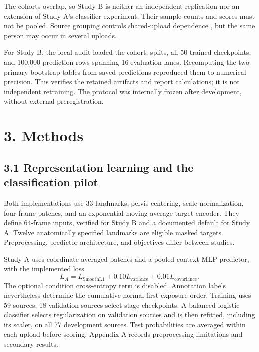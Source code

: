\documentclass{article}
\begin{document}
The cohorts overlap, so Study B is neither an independent replication
nor an extension of Study A's classifier experiment. Their sample counts
and scores must not be pooled. Source grouping controls shared-upload
dependence \citep{roberts2017crossvalidation}, but the same person may
occur in several uploads.

For Study B, the local audit loaded the cohort, splits, all 50 trained
checkpoints, and 100,000 prediction rows spanning 16 evaluation lanes.
Recomputing the two primary bootstrap tables from saved predictions
reproduced them to numerical precision. This verifies the retained
artifacts and report calculations; it is not independent retraining. The
protocol was internally frozen after development, without external
preregistration.

\section{3. Methods}\label{methods}

\subsection{3.1 Representation learning and the classification
pilot}\label{representation-learning-and-the-classification-pilot}

Both implementations use 33 landmarks, pelvis centering, scale
normalization, four-frame patches, and an exponential-moving-average
target encoder. They define 64-frame inputs, verified for Study B and a
documented default for Study A. Twelve anatomically specified landmarks
are eligible masked targets. Preprocessing, predictor architecture, and
objectives differ between studies.

Study A uses coordinate-averaged patches and a pooled-context MLP
predictor, with the implemented loss \[
L_A=L_{\mathrm{SmoothL1}}+0.10L_{\mathrm{variance}}+0.01L_{\mathrm{covariance}}.
\] The optional condition cross-entropy term is disabled. Annotation
labels nevertheless determine the cumulative normal-first exposure
order. Training uses 59 sources; 18 validation sources select stage
checkpoints. A balanced logistic classifier selects regularization on
validation sources and is then refitted, including its scaler, on all 77
development sources. Test probabilities are averaged within each upload
before scoring. Appendix A records preprocessing limitations and
secondary results.
\end{document}
